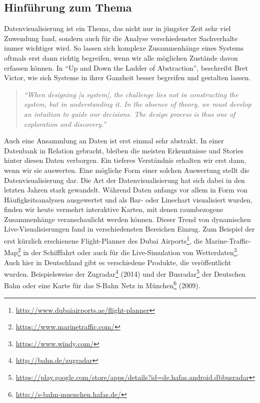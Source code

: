 \subsection{Hinführung zum Thema}
\label{sub:hinführung_zum_thema}
    Datenvisualisierung ist ein Thema, das nicht nur in jüngster Zeit sehr viel Zuwendung fand, sondern auch für die Analyse verschiedenster Sachverhalte immer wichtiger wird. So lassen sich komplexe Zusammenhänge eines Systems oftmals erst dann richtig begreifen, wenn wir alle möglichen Zustände davon erfassen können. In "`Up and Down the Ladder of Abstraction"', beschreibt Bret Victor, wie sich Systeme in ihrer Ganzheit besser begreifen und gestalten lassen.

    \begin{quote}
        \emph{"`When designing [a system], the challenge lies not in constructing the system, but in understanding it. In the absence of theory, we must develop an intuition to guide our decisions. The design process is thus one of exploration and discovery."'} \parencite{victor}
    \end{quote}

    Auch eine Ansammlung an Daten ist erst einmal sehr abstrakt. In einer Datenbank in Relation gebracht, bleiben die meisten Erkenntnisse und Stories hinter diesen Daten verborgen. Ein tieferes Verständnis erhalten wir erst dann, wenn wir sie auswerten. Eine mögliche Form einer solchen Auswertung stellt die Datenvisualisierung dar. Die Art der Datenvisualisierung hat sich dabei in den letzten Jahren stark gewandelt. Während Daten anfangs vor allem in Form von Häufigkeitsanalysen ausgewertet und als Bar- oder Linechart visualisiert wurden, finden wir heute vermehrt interaktive Karten, mit denen raumbezogene Zusammenhänge veranschaulicht werden können. Dieser Trend von dynamischen Live-Visualisierungen fand in verschiedensten Bereichen Einzug. Zum Beispiel der erst kürzlich erschienene Flight-Planner des Dubai Airports\footnote{\url{http://www.dubaiairports.ae/flight-planner}}, die Marine-Traffic-Map\footnote{\url{https://www.marinetraffic.com/}} in der Schifffahrt oder auch für die Live-Simulation von Wetterdaten\footnote{\url{https://www.windy.com/}}.\\

    Auch hier in Deutschland gibt es verschiedene Produkte, die veröffentlicht wurden. Beispielsweise der Zugradar\footnote{\url{http://bahn.de/zugradar}} (2014) und der Busradar\footnote{\url{https://play.google.com/store/apps/details?id=de.hafas.android.dbbusradar}} der Deutschen Bahn oder eine Karte für das S-Bahn Netz in München\footnote{\url{http://s-bahn-muenchen.hafas.de/}} (2009).

